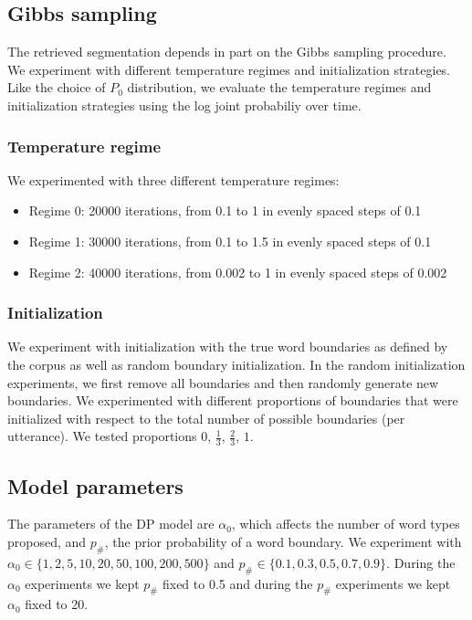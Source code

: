 \subsection{Gibbs sampling}

The retrieved segmentation depends in part on the Gibbs sampling procedure. We experiment with different temperature regimes and initialization strategies. Like the choice of $P_0$ distribution, we evaluate the temperature regimes and initialization strategies using the log joint probabiliy over time.

\subsubsection{Temperature regime}

We experimented with three different temperature regimes:

\begin{itemize}
\item Regime 0: 20000 iterations, from 0.1 to 1 in evenly spaced steps of 0.1
\item Regime 1: 30000 iterations, from 0.1 to 1.5 in evenly spaced steps of 0.1
\item Regime 2: 40000 iterations, from 0.002 to 1 in evenly spaced steps of 0.002
\end{itemize}

\subsubsection{Initialization}

We experiment with initialization with the true word boundaries as defined by the corpus as well as random boundary initialization. In the random initialization experiments, we first remove all boundaries and then randomly generate new boundaries. We experimented with different proportions of boundaries that were initialized with respect to the total number of possible boundaries (per utterance). We tested proportions $0$, $\frac{1}{3}$, $\frac{2}{3}$, $1$.

\subsection{Model parameters}

The parameters of the DP model are $\alpha_0$, which affects the number of word types proposed, and $p_\#$, the prior probability of a word boundary. We experiment with $\alpha_0 \in \{1, 2, 5, 10, 20, 50, 100, 200, 500\}$ and $p_\# \in \{0.1, 0.3, 0.5, 0.7, 0.9\}$. During the $\alpha_0$ experiments we kept $p_\#$ fixed to 0.5 and during the $p_\#$ experiments we kept $\alpha_0$ fixed to 20.


